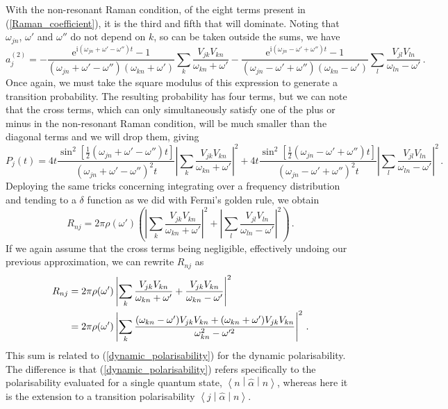\documentclass{article}
\theoremstyle{plain}\theoremheaderfont{\normalfont\itshape}\theorembodyfont{\rmfamily}\theoremseparator{.}\newtheorem*{rem}{Remark}\newtheorem*{ex}{Example}\newtheorem*{proof}{Proof}\newtheorem*{altp}{Alternative proof}
\theoremstyle{plain}\theoremheaderfont{\normalfont\bfseries}\theorembodyfont{\rmfamily}\theoremseparator{.}\newtheorem{thm}{Theorem}[section]\newtheorem{lem}[thm]{Lemma}\newtheorem{prop}[thm]{Proposition}\newtheorem*{cor}{Corollary}\newtheorem{defn}[thm]{Definition}\newtheorem{clm}[thm]{Claim}\newtheorem{clminproof}{Claim}
\theoremstyle{break}\theoremheaderfont{\normalfont\itshape}\theorembodyfont{\rmfamily}\theoremseparator{.\medskip}\newtheorem*{proofskip}{Proof}\newtheorem*{exs}{Examples}\newtheorem*{rems}{Remarks}
\theoremstyle{break}\theoremheaderfont{\normalfont\bfseries}\theorembodyfont{\rmfamily}\theoremseparator{.\medskip}\newtheorem{lemskip}[thm]{Lemma}\newtheorem{defnskip}[thm]{Definition}\newtheorem{propskip}[thm]{Proposition}\newtheorem{thmskip}[thm]{Theorem}
\numberwithin{equation}{section}
\newcommand{\ii}{\mathrm{i}}
\newcommand{\ee}{\mathrm{e}}
\newcommand{\mel}[3]{\left\langle #1 \middle| #2 \middle| #3 \right\rangle}
\newcommand{\abs}[1]{\left| #1 \right|}
\begin{document}
    With the non-resonant Raman condition, of the eight terms present in (\ref{Raman_coefficient}), it is the third and fifth that will dominate. Noting that \(\omega_{jn}\), \(\omega'\) and \(\omega''\) do not depend on \(k\), so can be taken outside the sums, we have
    \begin{equation}
        a_j^{(2)}=-\frac{\ee^{\ii(\omega_{jn}+\omega'-\omega'')t}-1}{(\omega_{jn}+\omega'-\omega'')(\omega_{kn}+\omega')}\sum_k\frac{V_{jk}V_{kn}}{\omega_{kn}+\omega'}-\frac{\ee^{\ii(\omega_{jn}-\omega'+\omega'')t}-1}{(\omega_{jn}-\omega'+\omega'')(\omega_{kn}-\omega')}\sum_l\frac{V_{jl}V_{ln}}{\omega_{ln}-\omega'}\,.
    \end{equation}
    Once again, we must take the square modulus of this expression to generate a transition probability. The resulting probability has four terms, but we can note that the cross terms, which can only simultaneously satisfy one of the plus or minus in the non-resonant Raman condition, will be much smaller than the diagonal terms and we will drop them, giving
    \begin{equation}
        P_j(t)=4t\frac{\sin^2[\frac{1}{2}(\omega_{jn}+\omega'-\omega'')t]}{(\omega_{jn}+\omega'-\omega'')^2 t}\abs{\sum_k\frac{V_{jk}V_{kn}}{\omega_{kn}+\omega'}}^2+4t\frac{\sin^2[\frac{1}{2}(\omega_{jn}-\omega'+\omega'')t]}{(\omega_{jn}-\omega'+\omega'')^2 t}\abs{\sum_l\frac{V_{jl}V_{ln}}{\omega_{ln}-\omega'}}^2\,.
    \end{equation}
    Deploying the same tricks concerning integrating over a frequency distribution and tending to a \(\delta\) function as we did with Fermi's golden rule, we obtain
    \begin{equation}
        R_{nj}=2\pi\rho(\omega')\left(\abs{\sum_k\frac{V_{jk}V_{kn}}{\omega_{kn}+\omega'}}^2+\abs{\sum_l\frac{V_{jl}V_{ln}}{\omega_{ln}-\omega'}}^2\right)\,.
    \end{equation}
    If we again assume that the cross terms being negligible, effectively undoing our previous approximation, we can rewrite \(R_{nj}\) as
    \begin{align}
        R_{nj}&=2\pi\rho(\omega')\abs{\sum_k\frac{V_{jk}V_{kn}}{\omega_{kn}+\omega'}+\frac{V_{jk}V_{kn}}{\omega_{kn}-\omega'}}^2\notag\\
        &=2\pi\rho(\omega')\abs{\sum_k\frac{(\omega_{kn}-\omega')V_{jk}V_{kn}+(\omega_{kn}+\omega')V_{jk}V_{kn}}{\omega_{kn}^2-\omega'^2}}^2\,.\label{}
    \end{align}
    This sum is related to (\ref{dynamic_polarisability}) for the dynamic polarisability. The difference is that (\ref{dynamic_polarisability}) refers specifically to the polarisability evaluated for a single quantum state, \(\mel{n}{\hat{\alpha}}{n}\), whereas here it is the extension to a transition polarisability \(\mel{j}{\hat{\alpha}}{n}\).
\end{document}

